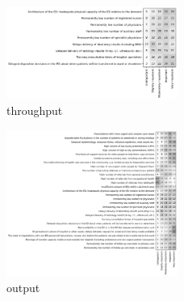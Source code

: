 \documentclass{article}
\begin{document}
\begin{figure}[H]
    \centering
        \includegraphics[width=0.5\textwidth]{throughput}
        \caption{throughput}
        \label{fig:throughput}
\end{figure}

\begin{figure}[H]
    \centering
        \includegraphics[width=0.5\textwidth]{output}
        \caption{output}
        \label{fig:output}
\end{figure}
\end{document}
